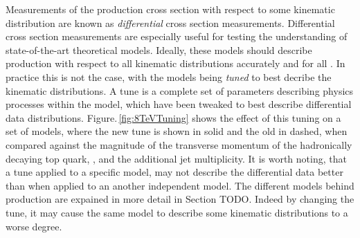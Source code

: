 Measurements of the \ttbar{} production cross section with respect to some kinematic distribution are known as \textit{differential} cross section measurements.
Differential cross section measurements are especially useful for testing the understanding of state-of-the-art theoretical models.
Ideally, these models should describe \ttbar{} production with respect to all kinematic distributions accurately and for all \sqrts{}.
In practice this is not the case, with the \ttbar{} models being \textit{tuned} to best decribe the kinematic distributions.
A tune is a complete set of parameters describing physics processes within the model, which have been tweaked to best describe differential data distributions.
Figure.\,\ref{fig:8TeVTuning} shows the effect of this tuning on a set of \ttbar{} models, where the new tune is shown in solid and the old in dashed, when compared against the magnitude of the transverse momentum of the hadronically decaying top quark, \ptToph{}, and the additional jet multiplicity.
It is worth noting, that a tune applied to a specific model, may not describe the differential data better than when applied to an another independent model.
The different models behind \ttbar{} production are expained in more detail in Section TODO.
Indeed by changing the tune, it may cause the same model to describe some kinematic distributions to a worse degree.
